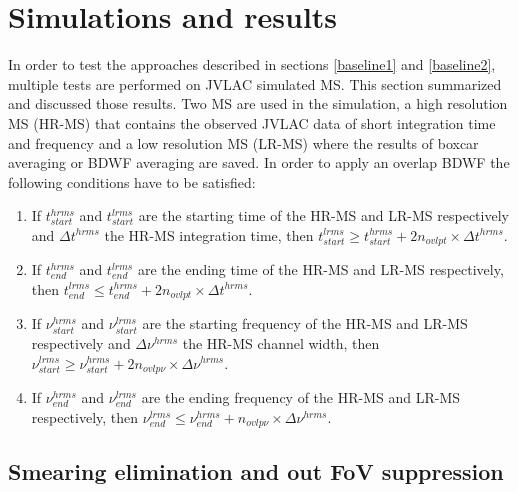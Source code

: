 \documentclass[useAMS,usenatbib]{mn2e}
\begin{document}
\section{Simulations and results}

In order to test the approaches described in sections \ref{baseline1} and \ref{baseline2}, multiple tests are performed on JVLAC 
simulated MS. This section summarized and discussed those results. Two MS are used in 
the simulation, a high resolution MS (HR-MS) that contains the observed JVLAC data of short integration time and frequency and a low 
resolution 
MS (LR-MS) where the results of boxcar averaging or BDWF averaging are saved. In order to apply an overlap BDWF  the following 
conditions have to be satisfied:
\begin{enumerate}
 \item If $t^{hrms}_{start}$ and $t^{lrms}_{start}$ are the starting time of the HR-MS and LR-MS respectively and  $\Delta t^{hrms}$ the 
HR-MS integration time, then 
	    $t^{lrms}_{start}\geq t^{hrms}_{start} + 2n_{ovlpt}\times \Delta t^{hrms}$. 
  \item If $t^{hrms}_{end}$ and $t^{lrms}_{end}$ are the ending time of the HR-MS and LR-MS respectively, then 
	    $t^{lrms}_{end}\leq t^{hrms}_{end} + 2n_{ovlpt}\times \Delta t^{hrms}$. 
 \item If $\nu^{hrms}_{start}$ and $\nu^{lrms}_{start}$ are the starting frequency of the HR-MS and LR-MS respectively and  $\Delta 
\nu^{hrms}$ the HR-MS channel width, then 
	    $\nu^{lrms}_{start} \geq \nu^{hrms}_{start} + 2n_{ovlp\nu}\times \Delta \nu^{hrms}$. 
 \item If $\nu^{hrms}_{end}$ and $\nu^{lrms}_{end}$ are the ending frequency of the HR-MS and LR-MS respectively, then 
	    $\nu^{lrms}_{end} \leq \nu^{hrms}_{end} + n_{ovlp\nu}\times \Delta \nu^{hrms}$. 
\end{enumerate}

\subsection{Smearing elimination and out FoV suppression}
\end{document}
